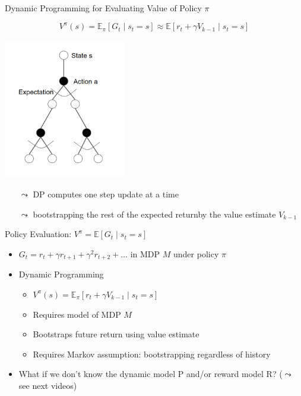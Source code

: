 \documentclass[aspectratio=169]{../latex_main/tntbeamer}  %
\begin{document}
\begin{frame}[c]{Dynamic Programming for Evaluating Value of Policy $\pi$}

$$V^\pi (s) = \mathbb{E}_\pi [G_t \mid s_t = s] \approx \mathbb{E} [r_t + \gamma V_{k-1} \mid s_t = s]$$

\begin{center}
	\includegraphics[width=0.4\textwidth]{images/state_action_graph2.png}
\end{center}

\vspace{-1cm}
\pause
\begin{itemize}
	\item[$\leadsto$] DP computes one step update at a time
	\item[$\leadsto$] bootstrapping the rest of the expected return\newline by the value estimate $V_{k-1}$
\end{itemize}

\end{frame}
\begin{frame}[c]{Policy Evaluation: $V^\pi = \mathbb{E}[G_t \mid s_t = s]$}

\begin{itemize}
	\item $G_t = r_t + \gamma r_{t+1} + \gamma^2 r_{t+2} + \ldots$ in MDP $M$ under policy $\pi$
	\item Dynamic Programming
	\begin{itemize}
		\item $V^\pi (s)  = \mathbb{E}_\pi [r_t + \gamma V_{k-1} \mid s_t = s]$
		\item \alert{Requires model of MDP $M$}
		\item Bootstraps future return using value estimate
		\item Requires Markov assumption: bootstrapping regardless of history
	\end{itemize}
	\pause
	\medskip
	\item What if we don't know the dynamic model P and/or reward model R? ($\leadsto$ see next videos)
\end{itemize}

\end{frame}
\end{document}
